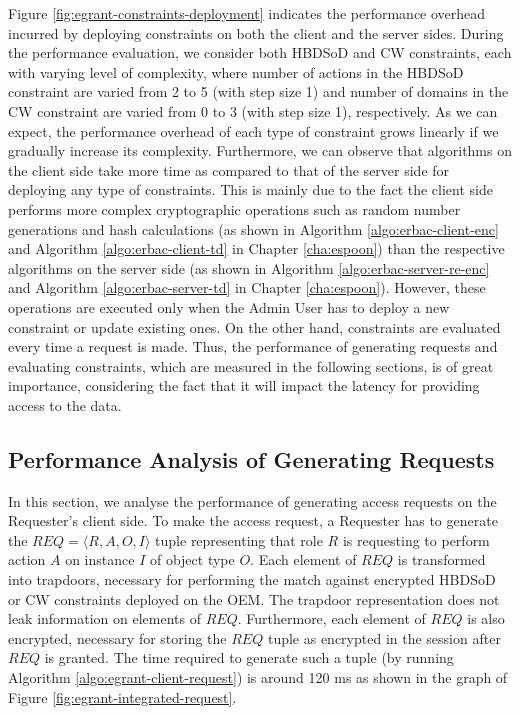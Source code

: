 \documentclass[epsfig,a4paper,11pt,titlepage]{book}
\numberwithin{algorithm}{chapter}
\begin{document}
Figure \ref{fig:egrant-constraints-deployment} indicates the performance overhead incurred by deploying constraints on both the client and the server sides. During the performance evaluation, we consider both \gls{HBDSoD} and \gls{CW} constraints, each with varying level of complexity, where number of actions in the \gls{HBDSoD} constraint are varied from 2 to 5 (with step size 1) and number of domains in the \gls{CW} constraint are varied from 0 to 3 (with step size 1), respectively. As we can expect, the performance overhead of each type of constraint grows linearly if we gradually increase its complexity. Furthermore, we can observe that algorithms on the client side take more time as compared to that of the server side for deploying any type of constraints. This is mainly due to the fact the client side performs more complex cryptographic operations such as random number generations and hash calculations (as shown in Algorithm \ref{algo:erbac-client-enc} and Algorithm \ref{algo:erbac-client-td} in Chapter \ref{cha:espoon}) than the respective algorithms on the server side (as shown in Algorithm \ref{algo:erbac-server-re-enc} and Algorithm \ref{algo:erbac-server-td} in Chapter \ref{cha:espoon}). However, these operations are executed only when the Admin User has to deploy a new constraint or update existing ones. On the other hand, constraints are evaluated every time a request is made. Thus, the performance of generating requests and evaluating constraints, which are measured in the following sections, is of great importance, considering the fact that it will impact the latency for providing access to the data.


\subsection{Performance Analysis of Generating Requests}

In this section, we analyse the performance of generating access requests on the Requester's client side. To make the access request, a Requester has to generate the $\mathit{REQ} = \langle R, A, O, I \rangle$ tuple representing that role $R$ is requesting to perform action $A$ on instance $I$ of object type $O$. Each element of $\mathit{REQ}$ is transformed into trapdoors, necessary for performing the match against encrypted \gls{HBDSoD} or \gls{CW} constraints deployed on the \gls{OEM}. The trapdoor representation does not leak information on elements of $\mathit{REQ}$. Furthermore, each element of $\mathit{REQ}$ is also encrypted, necessary for storing the $\mathit{REQ}$ tuple as encrypted in the session after $\mathit{REQ}$ is granted. The time required to generate such a tuple (by running Algorithm \ref{algo:egrant-client-request}) is around 120 \gls{ms} as shown in the graph of Figure \ref{fig:egrant-integrated-request}.
\end{document}

